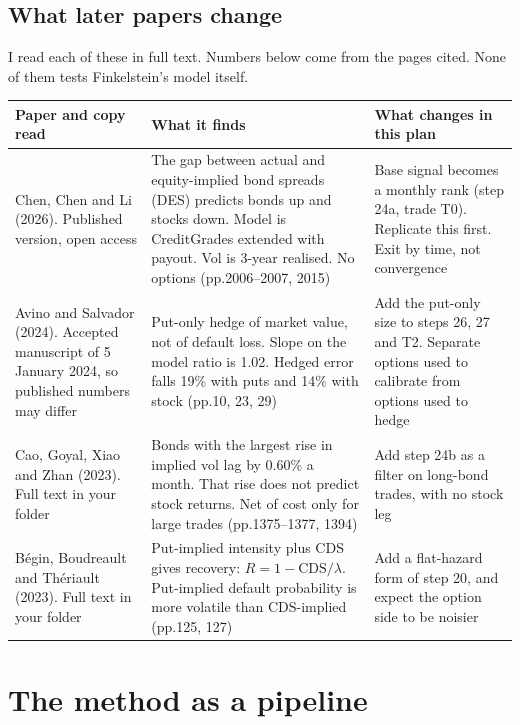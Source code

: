 \documentclass[10pt,a4paper]{article}
\begin{document}
\subsection*{What later papers change}

I read each of these in full text. Numbers below come from the pages cited. None of them tests Finkelstein's model itself.

\begin{center}
\footnotesize
\begin{tabularx}{\textwidth}{@{}>{\raggedright\arraybackslash}p{2.75cm}>{\raggedright\arraybackslash}X>{\raggedright\arraybackslash}X@{}}
\toprule
\textbf{Paper and copy read} & \textbf{What it finds} & \textbf{What changes in this plan}\\
\midrule
Chen, Chen and Li (2026). Published version, open access & The gap between actual and equity-implied bond spreads (DES) predicts bonds up and stocks down. Model is CreditGrades extended with payout. Vol is 3-year realised. No options (pp.2006--2007, 2015) & Base signal becomes a monthly rank (step 24a, trade T0). Replicate this first. Exit by time, not convergence\\
Avino and Salvador (2024). Accepted manuscript of 5 January 2024, so published numbers may differ & Put-only hedge of market value, not of default loss. Slope on the model ratio is 1.02. Hedged error falls 19\% with puts and 14\% with stock (pp.10, 23, 29) & Add the put-only size to steps 26, 27 and T2. Separate options used to calibrate from options used to hedge\\
Cao, Goyal, Xiao and Zhan (2023). Full text in your folder & Bonds with the largest rise in implied vol lag by 0.60\% a month. That rise does not predict stock returns. Net of cost only for large trades (pp.1375--1377, 1394) & Add step 24b as a filter on long-bond trades, with no stock leg\\
B\'egin, Boudreault and Th\'eriault (2023). Full text in your folder & Put-implied intensity plus CDS gives recovery: $R=1-\mathrm{CDS}/\lambda$. Put-implied default probability is more volatile than CDS-implied (pp.125, 127) & Add a flat-hazard form of step 20, and expect the option side to be noisier\\
\bottomrule
\end{tabularx}
\end{center}

\section{The method as a pipeline}\label{sec:pipeline}
\end{document}
